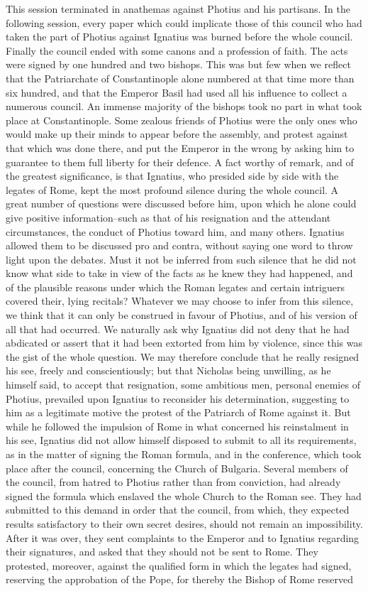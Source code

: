 This session terminated in anathemas against Photius and his partisans. In the following session, every paper which could implicate those of this council who had taken the part of Photius against Ignatius was burned before the whole council. Finally the council ended with some canons and a profession of faith. The acts were signed by one hundred and two bishops. This was but few when we reflect that the Patriarchate of Constantinople alone numbered at that time more than six hundred, and that the Emperor Basil had used all his influence to collect a numerous council. An immense majority of the bishops took no part in what took place at Constantinople. Some zealous friends of Photius were the only ones who would make up their minds to appear before the assembly, and protest against that which was done there, and put the Emperor in the wrong by asking him to guarantee to them full liberty for their defence. A fact worthy of remark, and of the greatest significance, is that Ignatius, who presided side by side with the legates of Rome, kept the most profound silence during the whole council. A great number of questions were discussed before him, upon which he alone could give positive information--such as that of his resignation and the attendant circumstances, the conduct of Photius toward him, and many others. Ignatius allowed them to be discussed pro and contra, without saying one word to throw light upon the debates. Must it not be inferred from such silence that he did not know what side to take in view of the facts as he knew they had happened, and of the plausible reasons under which the Roman legates and certain intriguers covered their, lying recitals? Whatever we may choose to infer from this silence, we think that it can only be construed in favour of Photius, and of his version of all that had occurred. We naturally ask why Ignatius did not deny that he had abdicated or assert that it had been extorted from him by violence, since this was the gist of the whole question. We may therefore conclude that he really resigned his see, freely and conscientiously; but that Nicholas being unwilling, as he himself said, to accept that resignation, some ambitious men, personal enemies of Photius, prevailed upon Ignatius to reconsider his determination, suggesting to him as a legitimate motive the protest of the Patriarch of Rome against it. But while he followed the impulsion of Rome in what concerned his reinstalment in his see, Ignatius did not allow himself disposed to submit to all its requirements, as in the matter of signing the Roman formula, and in the conference, which took place after the council, concerning the Church of Bulgaria. Several members of the council, from hatred to Photius rather than from conviction, had already signed the formula which enslaved the whole Church to the Roman see. They had submitted to this demand in order that the council, from which, they expected results satisfactory to their own secret desires, should not remain an impossibility. After it was over, they sent complaints to the Emperor and to Ignatius regarding their signatures, and asked that they should not be sent to Rome. They protested, moreover, against the qualified form in which the legates had signed, reserving the approbation of the Pope, for thereby the Bishop of Rome reserved 